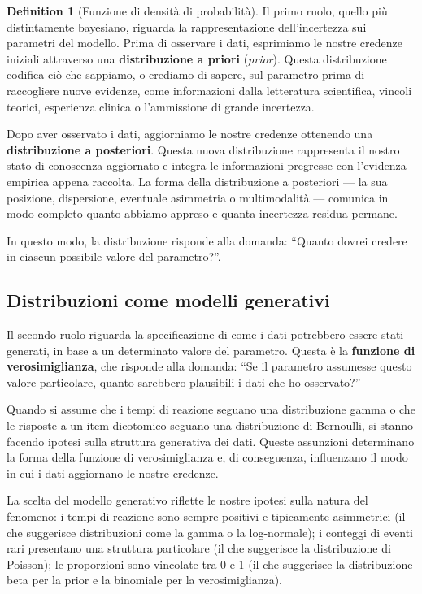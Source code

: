 \documentclass[
  letterpaper,
  DIV=11,
  numbers=noendperiod,
  oneside]{scrreprt}
\theoremstyle{definition}
\theoremstyle{plain}
\theoremstyle{definition}
\newtheorem{definition}{Definition}[chapter]
\theoremstyle{remark}
\begin{document}
\begin{definition}[Funzione di densità di
probabilità]
Il primo ruolo, quello più distintamente bayesiano, riguarda la
rappresentazione dell'incertezza sui parametri del modello. Prima di
osservare i dati, esprimiamo le nostre credenze iniziali attraverso una
\textbf{distribuzione a priori} (\emph{prior}). Questa distribuzione
codifica ciò che sappiamo, o crediamo di sapere, sul parametro prima di
raccogliere nuove evidenze, come informazioni dalla letteratura
scientifica, vincoli teorici, esperienza clinica o l'ammissione di
grande incertezza.

Dopo aver osservato i dati, aggiorniamo le nostre credenze ottenendo una
\textbf{distribuzione a posteriori}. Questa nuova distribuzione
rappresenta il nostro stato di conoscenza aggiornato e integra le
informazioni pregresse con l'evidenza empirica appena raccolta. La forma
della distribuzione a posteriori --- la sua posizione, dispersione,
eventuale asimmetria o multimodalità --- comunica in modo completo
quanto abbiamo appreso e quanta incertezza residua permane.

In questo modo, la distribuzione risponde alla domanda: ``Quanto dovrei
credere in ciascun possibile valore del parametro?''.

\subsection{Distribuzioni come modelli
generativi}\label{distribuzioni-come-modelli-generativi}

Il secondo ruolo riguarda la specificazione di come i dati potrebbero
essere stati generati, in base a un determinato valore del parametro.
Questa è la \textbf{funzione di verosimiglianza}, che risponde alla
domanda: ``Se il parametro assumesse questo valore particolare, quanto
sarebbero plausibili i dati che ho osservato?''

Quando si assume che i tempi di reazione seguano una distribuzione gamma
o che le risposte a un item dicotomico seguano una distribuzione di
Bernoulli, si stanno facendo ipotesi sulla struttura generativa dei
dati. Queste assunzioni determinano la forma della funzione di
verosimiglianza e, di conseguenza, influenzano il modo in cui i dati
aggiornano le nostre credenze.

La scelta del modello generativo riflette le nostre ipotesi sulla natura
del fenomeno: i tempi di reazione sono sempre positivi e tipicamente
asimmetrici (il che suggerisce distribuzioni come la gamma o la
log-normale); i conteggi di eventi rari presentano una struttura
particolare (il che suggerisce la distribuzione di Poisson); le
proporzioni sono vincolate tra 0 e 1 (il che suggerisce la distribuzione
beta per la prior e la binomiale per la verosimiglianza).


\end{definition}
\end{document}
